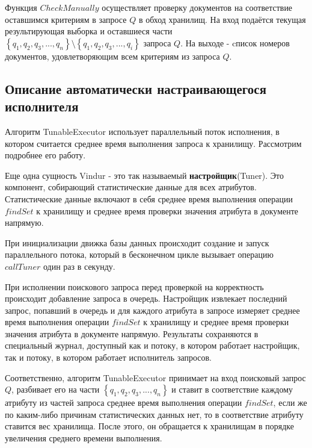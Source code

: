 \documentclass{matmex-diploma}
\begin{document}
        Функция $CheckManually$ осуществляет проверку документов на соответствие оставшимся критериям в запросе $Q$ в обход хранилищ. На вход подаётся текущая результирующая выборка и оставшиеся части $\left\{ q_1, q_2, q_3, ... , q_n \right\} \setminus \left\{ q_1, q_2, q_3, ... , q_i \right\}$ запроса $Q$. На выходе - cписок номеров документов, удовлетворяющим всем критериям из запроса $Q$.
        
    \subsection{Описание автоматически настраивающегося исполнителя}
        Алгоритм TunableExecutor использует параллельный поток исполнения, в котором считается среднее время выполнения запроса к хранилищу. Рассмотрим подробнее его работу.
        
        Еще одна сущность Vindur - это так называемый \textbf{настройщик}(Tuner). Это компонент, собирающий статистические данные для всех атрибутов. Статистические данные включают в себя среднее время выполнения операции $findSet$  к хранилищу и среднее время проверки значения атрибута в документе напрямую.
        
        При инициализации движка базы данных происходит создание и запуск параллельного потока, который в бесконечном цикле вызывает операцию $callTuner$ один раз в секунду.
        
        При исполнении поискового запроса перед проверкой на корректность происходит добавление запроса в очередь. Настройщик извлекает последний запрос, попавший в очередь и для каждого атрибута в запросе измеряет среднее время выполнения операции $findSet$  к хранилищу и среднее время проверки значения атрибута в документе напрямую. Результаты сохраняются в специальный журнал, доступный как и потоку, в котором работает настройщик, так и потоку, в котором работает исполнитель запросов.
        
        Соответственно, алгоритм TunableExecutor принимает на вход поисковый запрос $Q$, разбивает его на части $\left\{ q_1, q_2, q_3, ... , q_n \right\} $ и ставит в соответствие каждому атрибуту из частей запроса среднее время выполнения операции $findSet$, если же по каким-либо причинам статистических данных нет, то в соответствие атрибуту ставится вес хранилища. После этого, он обращается к хранилищам в порядке увеличения среднего времени выполнения. 
        
\end{document}
